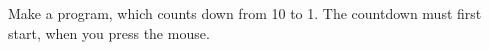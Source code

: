 Make a program, which counts down from 10 to 1. The countdown must
first start, when you press the mouse.